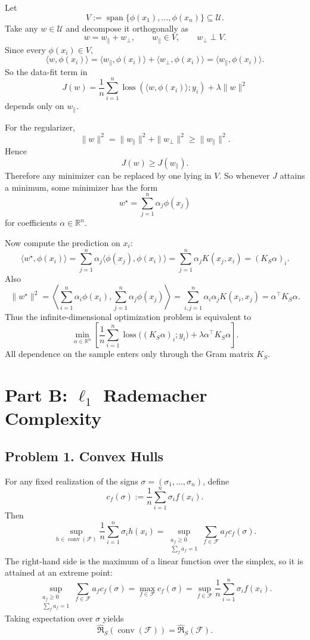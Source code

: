 \documentclass{article}
\DeclareMathOperator{\conv}{conv}
\newcommand{\cF}{\mathcal{F}}
\newcommand{\cU}{\mathcal{U}}
\begin{document}
Let
$$
V:=\operatorname{span}\{\phi(x_1),\dots,\phi(x_n)\}\subseteq \cU.
$$
Take any $w\in\cU$ and decompose it orthogonally as
$$
w=w_\parallel + w_\perp,
\qquad
w_\parallel \in V,
\qquad
w_\perp \perp V.
$$
Since every $\phi(x_i)\in V$,
$$
\langle w,\phi(x_i)\rangle
=
\langle w_\parallel,\phi(x_i)\rangle
+
\langle w_\perp,\phi(x_i)\rangle
=
\langle w_\parallel,\phi(x_i)\rangle.
$$
So the data-fit term in
$$
J(w)
=
\frac1n\sum_{i=1}^n \operatorname{loss}(\langle w,\phi(x_i)\rangle;y_i)
+
\lambda \|w\|^2
$$
depends only on $w_\parallel$.

For the regularizer,
$$
\|w\|^2
=
\|w_\parallel\|^2+\|w_\perp\|^2
\ge
\|w_\parallel\|^2.
$$
Hence
$$
J(w)\ge J(w_\parallel).
$$
Therefore any minimizer can be replaced by one lying in $V$. So whenever $J$ attains a minimum, some minimizer has the form
$$
w^\star = \sum_{j=1}^n \alpha_j \phi(x_j)
$$
for coefficients $\alpha\in\mathbb{R}^n$.

Now compute the prediction on $x_i$:
$$
\langle w^\star,\phi(x_i)\rangle
=
\sum_{j=1}^n \alpha_j \langle \phi(x_j),\phi(x_i)\rangle
=
\sum_{j=1}^n \alpha_j K(x_j,x_i)
=
(K_S \alpha)_i.
$$
Also
$$
\|w^\star\|^2
=
\left\langle
\sum_{i=1}^n \alpha_i \phi(x_i),
\sum_{j=1}^n \alpha_j \phi(x_j)
\right\rangle
=
\sum_{i,j=1}^n \alpha_i \alpha_j K(x_i,x_j)
=
\alpha^\top K_S \alpha.
$$
Thus the infinite-dimensional optimization problem is equivalent to
$$
\min_{\alpha\in\mathbb{R}^n}
\left[
\frac1n\sum_{i=1}^n \operatorname{loss}\bigl((K_S\alpha)_i;y_i\bigr)
+
\lambda \alpha^\top K_S \alpha
\right].
$$
All dependence on the sample enters only through the Gram matrix $K_S$.

\newpage
\section{\texorpdfstring{Part B: $\ell_1$ Rademacher Complexity}{Part B: l1 Rademacher Complexity}}

\subsection{Problem 1. Convex Hulls}

For any fixed realization of the signs $\sigma=(\sigma_1,\dots,\sigma_n)$, define
$$
c_f(\sigma)
:=
\frac1n \sum_{i=1}^n \sigma_i f(x_i).
$$
Then
$$
\sup_{h\in \conv(\cF)} \frac1n \sum_{i=1}^n \sigma_i h(x_i)
=
\sup_{\substack{a_f\ge 0\\ \sum_f a_f=1}}
\sum_{f\in\cF} a_f c_f(\sigma).
$$
The right-hand side is the maximum of a linear function over the simplex, so it is attained at an extreme point:
$$
\sup_{\substack{a_f\ge 0\\ \sum_f a_f=1}}
\sum_{f\in\cF} a_f c_f(\sigma)
=
\max_{f\in\cF} c_f(\sigma)
=
\sup_{f\in\cF} \frac1n\sum_{i=1}^n \sigma_i f(x_i).
$$
Taking expectation over $\sigma$ yields
$$
\widehat{\mathfrak{R}}_S(\conv(\cF))
=
\widehat{\mathfrak{R}}_S(\cF).
$$
\end{document}
